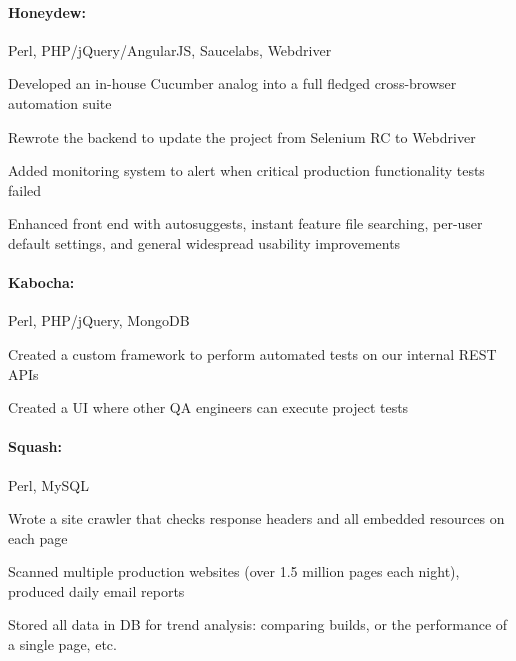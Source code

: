 \begin{position}

  \paragraph{Honeydew:} Perl, PHP/jQuery/AngularJS, Saucelabs, Webdriver
  \begin{myitem}
  \item Developed an in-house Cucumber analog into a full fledged cross-browser automation suite
  \item Rewrote the backend to update the project from Selenium RC to Webdriver
  \item Added monitoring system to alert when critical production functionality tests failed
  \item Enhanced front end with autosuggests, instant feature file searching, per-user default
    settings, and general widespread usability improvements
  \end{myitem}
%
  \paragraph{Kabocha:} Perl, PHP/jQuery, MongoDB
  \begin{myitem}
  \item Created a custom framework to perform automated tests on our internal REST APIs
  \item Created a UI where other QA engineers can execute project tests
  \end{myitem}

%
  \paragraph{Squash:} Perl, MySQL
  \begin{myitem}
  \item Wrote a site crawler that checks response headers and all embedded resources on each page
  \item Scanned multiple production websites (over 1.5 million pages each night), produced daily email reports
  \item Stored all data in DB for trend analysis: comparing builds, or the performance of a single page, etc.
  \end{myitem}
%

\end{position}
